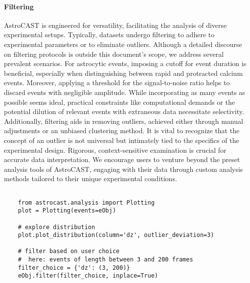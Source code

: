 \paragraph{Filtering}
AstroCAST is engineered for versatility, facilitating the analysis of diverse experimental setups. Typically, datasets undergo filtering to adhere to experimental parameters or to eliminate outliers. Although a detailed discourse on filtering protocols is outside this document's scope, we address several prevalent scenarios. For astrocytic events, imposing a cutoff for event duration is beneficial, especially when distinguishing between rapid and protracted calcium events. Moreover, applying a threshold for the signal-to-noise ratio helps to discard events with negligible amplitude. While incorporating as many events as possible seems ideal, practical constraints like computational demands or the potential dilution of relevant events with extraneous data necessitate selectivity. Additionally, filtering aids in removing outliers, achieved either through manual adjustments or an unbiased clustering method. It is vital to recognize that the concept of an outlier is not universal but intimately tied to the specifics of the experimental design. Rigorous, context-sensitive examination is crucial for accurate data interpretation. We encourage users to venture beyond the preset analysis tools of AstroCAST, engaging with their data through custom analysis methods tailored to their unique experimental conditions.

\begin{lstlisting}[style=pyStyle]

    from astrocast.analysis import Plotting
    plot = Plotting(events=eObj)

    # explore distribution
    plot.plot_distribution(column='dz', outlier_deviation=3)

    # filter based on user choice
    #  here: events of length between 3 and 200 frames
    filter_choice = {'dz': (3, 200)}
    eObj.filter(filter_choice, inplace=True)

\end{lstlisting}

